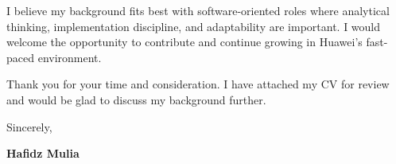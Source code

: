 \documentclass[a4paper,11pt]{article}
\begin{document}
I believe my background fits best with software-oriented roles where analytical thinking, implementation discipline, and adaptability are important. I would welcome the opportunity to contribute and continue growing in Huawei's fast-paced environment.

Thank you for your time and consideration. I have attached my CV for review and would be glad to discuss my background further.

Sincerely,

\vspace{12pt}

\textbf{Hafidz Mulia}
\end{document}
